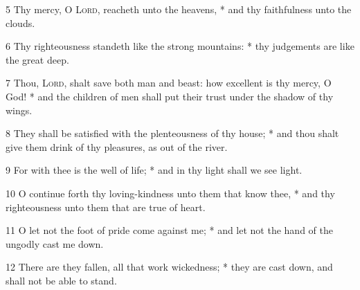 5 Thy mercy, O {\textsc{Lord}}, reacheth unto the heavens, * and thy faithfulness unto the clouds.\par
6 Thy righteousness standeth like the strong mountains: * thy judgements are like the great deep.\par
7 Thou, {\textsc{Lord}}, shalt save both man and beast: how excellent is thy mercy, O God! * and the children of men shall put their trust under the shadow of thy wings.\par
8 They shall be satisfied with the plenteousness of thy house; * and thou shalt give them drink of thy pleasures, as out of the river.\par
9 For with thee is the well of life; * and in thy light shall we see light.\par
10 O continue forth thy loving-kindness unto them that know thee, * and thy righteousness unto them that are true of heart.\par
11 O let not the foot of pride come against me; * and let not the hand of the ungodly cast me down.\par
12 There are they fallen, all that work wickedness; * they are cast down, and shall not be able to stand.

